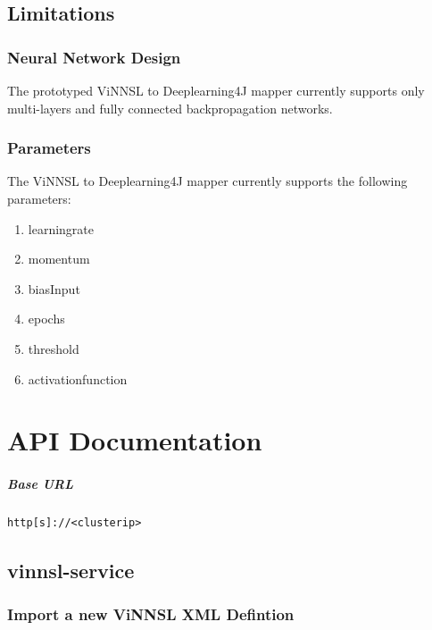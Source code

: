 \section{Limitations}\label{limitations}

\subsection{Neural Network Design}\label{neural-network-design}

The prototyped ViNNSL to Deeplearning4J mapper currently supports only
multi-layers and fully connected backpropagation networks.

\subsection{Parameters}\label{parameters}

The ViNNSL to Deeplearning4J mapper currently supports the following
parameters:

\begin{enumerate}
\def\labelenumi{\arabic{enumi}.}
\tightlist
\item
  learningrate
\item
  momentum
\item
  biasInput
\item
  epochs
\item
  threshold
\item
  activationfunction
\end{enumerate}

\chapter{API Documentation}\label{api-documentation}

\paragraph{Base URL}\label{base-url}

\begin{verbatim}
http[s]://<clusterip>
\end{verbatim}

\section{vinnsl-service}\label{vinnsl-service-2}

\subsection{Import a new ViNNSL XML
Defintion}\label{import-a-new-vinnsl-xml-defintion}

